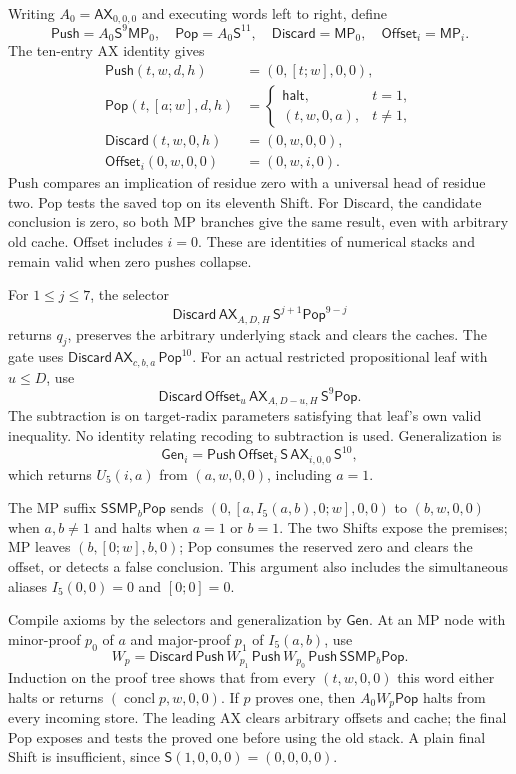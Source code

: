 Writing $A_0=\mathsf{AX}_{0,0,0}$ and executing words left to right, define
\[
 \mathsf{Push}=A_0\mathsf S^9\mathsf{MP}_0,\quad
 \mathsf{Pop}=A_0\mathsf S^{11},\quad
 \mathsf{Discard}=\mathsf{MP}_0,\quad
 \mathsf{Offset}_i=\mathsf{MP}_i.
\]
The ten-entry AX identity gives
\[
\begin{aligned}
 \mathsf{Push}(t,w,d,h)&=(0,[t;w],0,0),\\
 \mathsf{Pop}(t,[a;w],d,h)&=
 \begin{cases}\mathsf{halt},&t=1,\\(t,w,0,a),&t\ne1,\end{cases}\\
 \mathsf{Discard}(t,w,0,h)&=(0,w,0,0),\\
 \mathsf{Offset}_i(0,w,0,0)&=(0,w,i,0).
\end{aligned}
\]
Push compares an implication of residue zero with a universal head of
residue two. Pop tests the saved top on its eleventh Shift. For Discard,
the candidate conclusion is zero, so both MP branches give the same
result, even with arbitrary old cache. Offset includes $i=0$. These are
identities of numerical stacks and remain valid when zero pushes collapse.

For $1\le j\le7$, the selector
\[
 \mathsf{Discard}\,\mathsf{AX}_{A,D,H}\,
                  \mathsf S^{j+1}\mathsf{Pop}^{9-j}
\]
returns $q_j$, preserves the arbitrary underlying stack and clears the
caches. The gate uses
$\mathsf{Discard}\,\mathsf{AX}_{c,b,a}\,\mathsf{Pop}^{10}$.
For an actual restricted propositional leaf with $u\le D$, use
\[
 \mathsf{Discard}\,\mathsf{Offset}_u\,
        \mathsf{AX}_{A,D-u,H}\,\mathsf S^9\mathsf{Pop}.
\]
The subtraction is on target-radix parameters satisfying that leaf's own
valid inequality. No identity relating recoding to subtraction is used.
Generalization is
\[
 \mathsf{Gen}_i=\mathsf{Push}\,\mathsf{Offset}_i\,\mathsf S\,
                       \mathsf{AX}_{i,0,0}\,\mathsf S^{10},
\]
which returns $U_5(i,a)$ from $(a,w,0,0)$, including $a=1$.

The MP suffix $\mathsf S\mathsf S\mathsf{MP}_b\mathsf{Pop}$ sends
$(0,[a,I_5(a,b),0;w],0,0)$ to $(b,w,0,0)$ when $a,b\ne1$ and halts
when $a=1$ or $b=1$. The two Shifts expose the premises; MP leaves
$(b,[0;w],b,0)$; Pop consumes the reserved zero and clears the offset,
or detects a false conclusion. This argument also includes the simultaneous
aliases $I_5(0,0)=0$ and $[0;0]=0$.

Compile axioms by the selectors and generalization by $\mathsf{Gen}$.
At an MP node with minor-proof $p_0$ of $a$ and major-proof $p_1$ of
$I_5(a,b)$, use
\[
 W_p=\mathsf{Discard}\,\mathsf{Push}\,
 W_{p_1}\,\mathsf{Push}\,W_{p_0}\,\mathsf{Push}\,
 \mathsf S\mathsf S\mathsf{MP}_b\mathsf{Pop}.
\]
Induction on the proof tree shows that from every $(t,w,0,0)$ this word
either halts or returns $(\operatorname{concl}p,w,0,0)$.
If $p$ proves one, then $A_0W_p\mathsf{Pop}$ halts from every incoming
store. The leading AX clears arbitrary offsets and cache; the final Pop
exposes and tests the proved one before using the old stack. A plain final
Shift is insufficient, since $\mathsf S(1,0,0,0)=(0,0,0,0)$.


